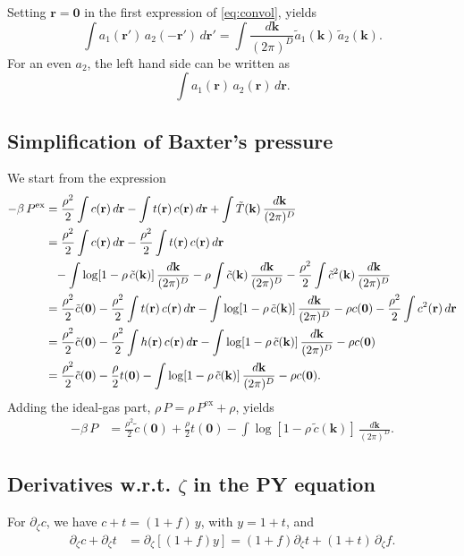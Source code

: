 \documentclass[preprint]{revtex4-1}
\numberwithin{equation}{subsection}
\numberwithin{table}{section}
\newcommand{\vct}[1]{\mathbf{#1}}
\providecommand{\vr}{} %
\renewcommand{\vr}{\vct{r}}
\newcommand{\vk}{\vct{k}}
\newcommand{\dvk}{\frac{d\vk}{(2\pi)^D}}
\begin{document}
Setting $\vr = \vct 0$ in the first expression of \eqref{eq:convol}, yields
\[
  \int a_1(\vr') \, a_2(-\vr') \, d\vr'
= \int \dvk \tilde{a}_1(\vk) \, \tilde{a}_2(\vk).
\]
For an even $a_2$,
the left hand side can be written as
\[
  \int a_1(\vr) \, a_2(\vr) \, d\vr.
\]



\subsection{Simplification of Baxter's pressure}



We start from the expression
%
\begin{align*}
-\beta \, P^\mathrm{ex}
&=
\frac{\rho^2}{2}
\int c(\vr) \, d\vr
-\int t(\vr) \, c(\vr) \, d\vr
+\int \tilde T(\vk) \, \dvk
\\
&=
\frac{\rho^2}{2} \int c(\vr) \, d\vr
-\frac{\rho^2}{2} \int t(\vr) \, c(\vr) \, d\vr
\\
&\hphantom{=}
-\int \log[1 - \rho \, \tilde c(\vk)] \, \dvk
-\rho \int \tilde c(\vk) \, \dvk
-\frac{\rho^2}{2} \int \tilde c^2(\vk) \, \dvk
\\
&=
\frac{\rho^2}{2} \tilde c(\vct 0)
-\frac{\rho^2}{2} \int t(\vr) \, c(\vr) \, d\vr
-\int \log[1 - \rho \, \tilde c(\vk)] \, \dvk
-\rho c(\vct 0)
-\frac{\rho^2}{2} \int c^2(\vr) \, d\vr
\\
&=
\frac{\rho^2}{2} \tilde c(\vct 0)
-\frac{\rho^2}{2} \int h(\vr) \, c(\vr) \, d\vr
-\int \log[1 - \rho \, \tilde c(\vk)] \, \dvk
-\rho c(\vct 0)
\\
&=
\frac{\rho^2}{2} \tilde c(\vct 0)
-\frac{\rho}{2} t(\vct 0)
-\int \log[1 - \rho \, \tilde c(\vk)] \, \dvk
-\rho c(\vct 0).
\end{align*}
%
Adding the ideal-gas part,
$\rho \, P = \rho \, P^\mathrm{ex} + \rho$,
yields
%
\begin{align*}
-\beta \, P
&=
\frac{\rho^2}{2} \tilde c(\vct 0)
+\frac{\rho}{2} t(\vct 0)
-\int \log[1 - \rho \, \tilde c(\vk)] \, \dvk.
\end{align*}





\subsection{Derivatives w.r.t. $\zeta$ in the PY equation}



For $\partial_\zeta c$,
we have $c + t = (1 + f) \, y$,
with $y = 1 + t$,
and
\begin{align*}
\partial_\zeta c
+ \partial_\zeta t
&= \partial_\zeta [(1+f)y]
=
(1 + f) \partial_\zeta t
+ (1 + t) \, \partial_\zeta f.
\end{align*}
\end{document}
